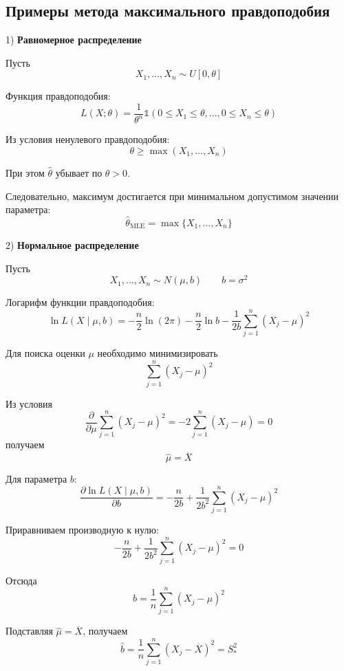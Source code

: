 \documentclass[12pt,a4paper]{article}
\begin{document}
\subsection{Примеры метода максимального правдоподобия}

\begin{example}

1) \textbf{Равномерное распределение}

Пусть
\[
X_1,\ldots,X_n\sim U[0,\theta]
\]

Функция правдоподобия:
\[
L(X;\theta)
=
\frac{1}{\theta^n}
\mathbb{1}
\left(
0\le X_1\le\theta,\ldots,
0\le X_n\le\theta
\right)
\]

Из условия ненулевого правдоподобия:
\[
\theta\ge\max(X_1,\ldots,X_n)
\]

При этом $\hat{\theta}$ убывает по $\theta>0$.

Следовательно, максимум достигается при минимальном допустимом значении параметра:
\[
\hat{\theta}_{\mathrm{MLE}}
=
\max\{X_1,\ldots,X_n\}
\]

2) \textbf{Нормальное распределение}

Пусть
\[
X_1,\ldots,X_n\sim N(\mu,b)
\qquad b=\sigma^2
\]

Логарифм функции правдоподобия:
\[
\ln L(X\mid\mu,b)
=
-\frac{n}{2}\ln(2\pi)
-\frac{n}{2}\ln b
-\frac{1}{2b}\sum_{j=1}^{n}(X_j-\mu)^2
\]

Для поиска оценки $\mu$ необходимо минимизировать
\[
\sum_{j=1}^{n}(X_j-\mu)^2
\]

Из условия
\[
\frac{\partial}{\partial\mu}
\sum_{j=1}^{n}(X_j-\mu)^2
=
-2\sum_{j=1}^{n}(X_j-\mu)=0
\]
получаем
\[
\hat{\mu}=\overline{X}
\]

Для параметра $b$:
\[
\frac{\partial\ln L(X\mid\mu,b)}{\partial b}
=
-\frac{n}{2b}
+
\frac{1}{2b^2}
\sum_{j=1}^{n}(X_j-\mu)^2
\]

Приравниваем производную к нулю:
\[
-\frac{n}{2b}
+
\frac{1}{2b^2}
\sum_{j=1}^{n}(X_j-\mu)^2
=0
\]

Отсюда
\[
b=\frac{1}{n}\sum_{j=1}^{n}(X_j-\mu)^2
\]

Подставляя $\hat{\mu}=\overline{X}$, получаем
\[
\hat{b}
=
\frac{1}{n}\sum_{j=1}^{n}(X_j-\overline{X})^2
=
S_*^2
\]

\end{example}

\newpage
\end{document}

